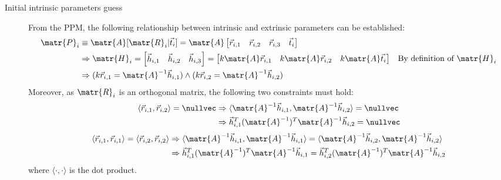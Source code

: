 \begin{description}
    \item[Initial intrinsic parameters guess]
        From the PPM, the following relationship between intrinsic and extrinsic parameters can be established:
        \[
            \begin{aligned}
                \matr{P}_i &\equiv \matr{A}[\matr{R}_i | \vec{t}_i] = \matr{A} \begin{bmatrix} \vec{r}_{i,1} & \vec{r}_{i,2} & \vec{r}_{i,3} & \vec{t}_{i} \end{bmatrix} \\
                    &\Rightarrow \matr{H}_i = \begin{bmatrix} \vec{h}_{i,1} & \vec{h}_{i,2} & \vec{h}_{i,3} \end{bmatrix} = 
                        \begin{bmatrix} k\matr{A}\vec{r}_{i,1} & k\matr{A}\vec{r}_{i,2} & k\matr{A}\vec{t}_{i} \end{bmatrix}
                        & \text{By definition of $\matr{H}_i$} \\
                    &\Rightarrow (k\vec{r}_{i,1} = \matr{A}^{-1} \vec{h}_{i,1}) \land (k\vec{r}_{i,2} = \matr{A}^{-1}\vec{h}_{i,2})
            \end{aligned}
        \]
        Moreover, as $\matr{R}_i$ is an orthogonal matrix, the following two constraints must hold:
        \[
            \begin{split}
                \langle \vec{r}_{i,1}, \vec{r}_{i,2} \rangle = \nullvec &\Rightarrow 
                    \langle \matr{A}^{-1} \vec{h}_{i,1}, \matr{A}^{-1} \vec{h}_{i,2} \rangle = \nullvec \\
                    &\Rightarrow \vec{h}_{i,1}^T (\matr{A}^{-1})^T \matr{A}^{-1} \vec{h}_{i,2} = \nullvec
            \end{split}
        \]
        \[
            \begin{split}
                \langle \vec{r}_{i,1}, \vec{r}_{i,1} \rangle = \langle \vec{r}_{i,2}, \vec{r}_{i,2} \rangle &\Rightarrow
                    \langle \matr{A}^{-1} \vec{h}_{i,1}, \matr{A}^{-1} \vec{h}_{i,1} \rangle = \langle \matr{A}^{-1} \vec{h}_{i,2}, \matr{A}^{-1} \vec{h}_{i,2} \rangle \\
                    &\Rightarrow \vec{h}_{i,1}^T (\matr{A}^{-1})^T \matr{A}^{-1} \vec{h}_{i,1} = \vec{h}_{i,2}^T (\matr{A}^{-1})^T \matr{A}^{-1} \vec{h}_{i,2}
            \end{split}
        \]
        where $\langle \cdot, \cdot \rangle$ is the dot product.
        

\end{description}
